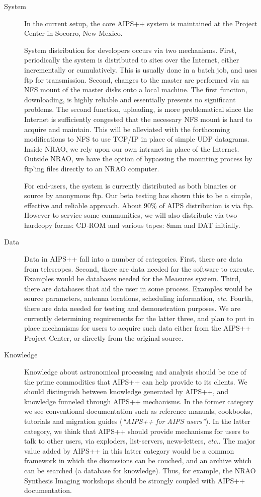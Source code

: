 \begin{description}
\item[System] In the current setup, the core AIPS++ system is maintained 
at the Project Center in Socorro, New Mexico. 

System distribution for developers occurs via two mechanisms. First,
periodically the system is distributed to sites over the Internet,
either incrementally or cumulatively.  This is usually done in a batch
job, and uses ftp for transmission.  Second, changes to the master are
performed via an NFS mount of the master disks onto a local machine.
The first function, downloading, is highly reliable and essentially
presents no significant problems.  The second function, uploading, is
more problematical since the Internet is sufficiently congested that
the necessary NFS mount is hard to acquire and maintain.  This will be
alleviated with the forthcoming modifications to NFS to use TCP/IP in
place of simple UDP datagrams.  Inside NRAO, we rely upon our own
intranet in place of the Internet.  Outside NRAO, we have the option
of bypassing the mounting process by ftp'ing files directly to an NRAO
computer.

For end-users, the system is currently distributed as both binaries
or source by anonymous ftp.  Our beta testing has shown this to be a
simple, effective and reliable approach.  About 90\% of AIPS
distribution is via ftp. However to service some communities, we will
also distribute via two hardcopy forms: CD-ROM and various tapes: 8mm
and DAT initially.

\item[Data] Data in AIPS++ fall into a number of categories. First,
there are data from telescopes.  Second, there are data needed for the
software to execute. Examples would be databases needed for the
Measures system. Third, there are databases that aid the user in some
process. Examples would be source parameters, antenna locations,
scheduling information, {\em etc.}  Fourth, there are data needed for
testing and demonstration purposes.  We are currently determining
requirements for the latter three, and plan to put in place mechanisms
for users to acquire such data either from the AIPS++ Project Center,
or directly from the original source.

\item[Knowledge] Knowledge about astronomical processing and analysis
should be one of the prime commodities that AIPS++ can help provide to
its clients. We should distinguish between knowledge generated by
AIPS++, and knowledge funneled through AIPS++ mechanisms. In the
former category we see conventional documentation such as reference
manuals, cookbooks, tutorials and migration guides ({\em ``AIPS++ for
AIPS users''}).  In the latter category, we think that AIPS++ should
provide mechanisms for users to talk to other users, via exploders,
list-servers, news-letters, {\em etc.}. The major value added by AIPS++
in this latter category would be a common framework in which the
discussions can be couched, and an archive which can be searched (a
database for knowledge). Thus, for example, the NRAO Synthesis
Imaging workshops should be strongly coupled with AIPS++
documentation.


\end{description}
